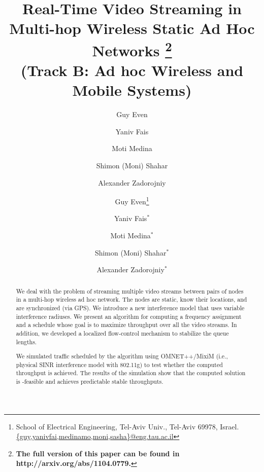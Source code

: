 \documentclass[11pt]{article}
\newenvironment{proof sketch}[1]{\noindent {\emph{Proof sketch of #1:}}}{\hfill \qed}
\newcommand{\SINR}{\text{\sc{sinr}}}
\begin{document}
\title{Real-Time Video Streaming in Multi-hop Wireless Static Ad Hoc Networks \protect\footnote{\textbf{The full version of this paper can be found in http://arxiv.org/abs/1104.0779.}}\\
  \Large(Track B: Ad hoc Wireless and Mobile Systems)}

\ifnum{} \author{%
  Guy Even \and Yaniv Fais \and Moti Medina
%
  \and Shimon (Moni) Shahar \and Alexander Zadorojniy}

 \fi

\ifnum{} \author{%
  Guy Even\thanks{School of Electrical Engineering, Tel-Aviv Univ.,
    Tel-Aviv 69978, Israel.
    \protect\url{{guy,yanivfai,medinamo,moni,sasha}@eng.tau.ac.il}}
  \and Yaniv Fais$^*$ \and Moti Medina$^*$
%
  \and Shimon (Moni) Shahar$^*$ \and Alexander Zadorojniy$^*$ } \fi

\date{}

\maketitle



\begin{abstract}
  We deal with the problem of streaming multiple video streams between
  pairs of nodes in a multi-hop wireless ad hoc network.  The nodes
  are static, know their locations, and are synchronized (via GPS).  We introduce a new interference model that
  uses variable interference radiuses. We present an algorithm for
  computing a frequency assignment and a schedule whose goal is to
  maximize throughput over all the video streams.  In addition, we
  developed a localized flow-control mechanism to stabilize the queue
  lengths.

  We simulated traffic scheduled by the algorithm using OMNET++/MixiM
  (i.e., physical SINR interference model with 802.11g) to test
  whether the computed throughput is achieved. The results of the
  simulation show that the computed solution is \SINR-feasible and
  achieves predictable stable throughputs.
\end{abstract}

\end{document}
